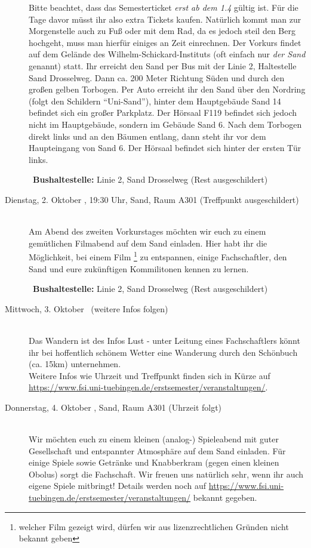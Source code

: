 \begin{description}
\ifsommersemester
Bitte beachtet, dass das Semesterticket \emph{erst ab dem 1.4} gültig ist. Für die Tage davor müsst ihr also extra Tickets kaufen. Natürlich kommt man zur Morgenstelle auch zu Fuß oder mit dem Rad, da es jedoch steil den Berg hochgeht, muss man hierfür einiges an Zeit einrechnen.
\fi
Der Vorkurs findet auf dem Gelände des Wilhelm-Schickard-Instituts (oft einfach nur \emph{der Sand} genannt) statt. Ihr erreicht den Sand per Bus mit der Linie 2, Haltestelle Sand Drosselweg. Dann ca. 200 Meter Richtung Süden und durch den großen gelben Torbogen. Per Auto erreicht ihr den Sand über den Nordring (folgt den Schildern "`Uni-Sand"'), hinter dem Hauptgebäude Sand 14 befindet sich ein großer Parkplatz. Der Hörsaal F119 befindet sich jedoch nicht im Hauptgebäude, sondern im Gebäude Sand 6. Nach dem Torbogen direkt links und an den Bäumen entlang, dann steht ihr vor dem Haupteingang von Sand 6. Der Hörsaal befindet sich hinter der ersten Tür links.

~\textbf{Bushaltestelle:} Linie 2, Sand Drosselweg (Rest ausgeschildert)
\fi 

\item[Dienstag, 2. Oktober \YEAR, 19:30 Uhr, Sand, Raum A301 (Treffpunkt ausgeschildert)]\ \\
Am Abend des zweiten Vorkurstages möchten wir euch zu einem gemütlichen Filmabend auf dem Sand einladen.
Hier habt ihr die Möglichkeit, bei einem Film \footnote{welcher Film gezeigt wird, dürfen wir aus lizenzrechtlichen Gründen nicht bekannt geben} zu entspannen, einige Fachschaftler, den Sand und eure zukünftigen Kommilitonen kennen zu lernen.

~\textbf{Bushaltestelle:} Linie 2, Sand Drosselweg (Rest ausgeschildert)

\item[Mittwoch, 3. Oktober \YEAR~(weitere Infos folgen)]\ \\
Das Wandern ist des Infos Lust - unter Leitung eines Fachschaftlers könnt ihr bei hoffentlich schönem Wetter eine Wanderung durch den Schönbuch (ca. 15km) unternehmen. \\
Weitere Infos wie Uhrzeit und Treffpunkt finden sich in Kürze auf \url{https://www.fsi.uni-tuebingen.de/erstsemester/veranstaltungen/}.

\item[Donnerstag, 4. Oktober \YEAR, Sand, Raum A301 (Uhrzeit folgt)]\ \\
Wir möchten euch zu einem kleinen (analog-) Spieleabend mit guter Gesellschaft und entspannter Atmosphäre auf dem Sand einladen. Für einige Spiele sowie Getränke und Knabberkram (gegen einen kleinen Obolus) sorgt die Fachschaft. Wir freuen uns natürlich sehr, wenn ihr auch eigene Spiele mitbringt! Details werden noch auf \url{https://www.fsi.uni-tuebingen.de/erstsemester/veranstaltungen/} bekannt gegeben.


\end{description}
